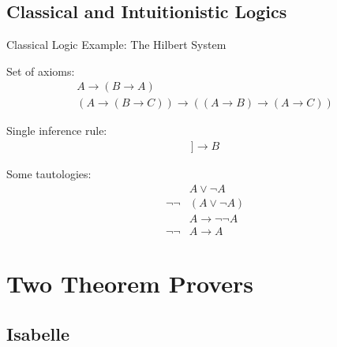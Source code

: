 \documentclass[aspectratio=169, fleqn]{beamer}
\begin{document}
\subsection{Classical and Intuitionistic Logics}

\begin{frame}{Classical Logic}
{Example: The Hilbert System}

\vspace{15pt}
Set of axioms:
\begin{gather}
A \rightarrow (B \rightarrow A)
\tag{A1} \\
(A \rightarrow (B \rightarrow C)) \rightarrow ((A \rightarrow B) \rightarrow (A \rightarrow C))
\tag{A2}
\end{gather}

Single inference rule:
\begin{gather} 
[\![ A, A \rightarrow B ]\!] \longrightarrow B
\tag{MP}
\end{gather}

Some tautologies:
\begin{align*}
& A \lor \neg A
\tag{EM} \\
%
\neg \neg & (A \lor \neg A)
\tag{nnEM} \\
%
& A \rightarrow \neg \neg A
\tag{DNi} \\
%
\neg \neg & A \rightarrow A
\tag{DNe}
\end{align*}




\end{frame}



\section{Two Theorem Provers}

\subsection{Isabelle}
\end{document}

